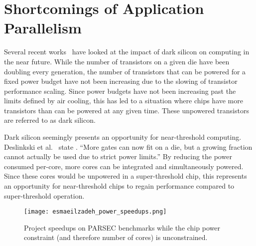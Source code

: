\section{Shortcomings of Application Parallelism}

Several recent works~\cite{Esmaeilzadeh2011Dark-silicon-an,Hardavellas:2011de}
have looked at the impact of dark silicon on computing in the near future. While
the number of transistors on a given die have been doubling every generation,
the number of transistors that can be powered for a fixed power budget have not
been increasing due to the slowing of transistor performance scaling. Since
power budgets have not been increasing past the limits defined by air cooling,
this has led to a situation where chips have more transistors than can be
powered at any given time. These unpowered transistors are referred to as dark
silicon.

Dark silicon seemingly presents an opportunity for near-threshold computing.
Deslinkski et al.~\cite{dreslinski2010near} state . ``More gates can now fit on
a die, but a growing fraction cannot actually be used due to strict power
limits.'' By reducing the power consumed per-core, more cores can be integrated
and simultaneously powered. Since these cores would be unpowered in a
super-threshold chip, this represents an opportunity for near-threshold chips to
regain performance compared to super-threshold operation.

\begin{figure}[thpb]
    \centering
    \texttt{[image: esmaeilzadeh\_power\_speedups.png]}
    \caption{Project speedups on PARSEC benchmarks while the chip power
constraint (and therefore number of cores) is unconstrained. ~\cite{Esmaeilzadeh2011Dark-silicon-an}}
    \label{fig:power_speedups}
\end{figure}

